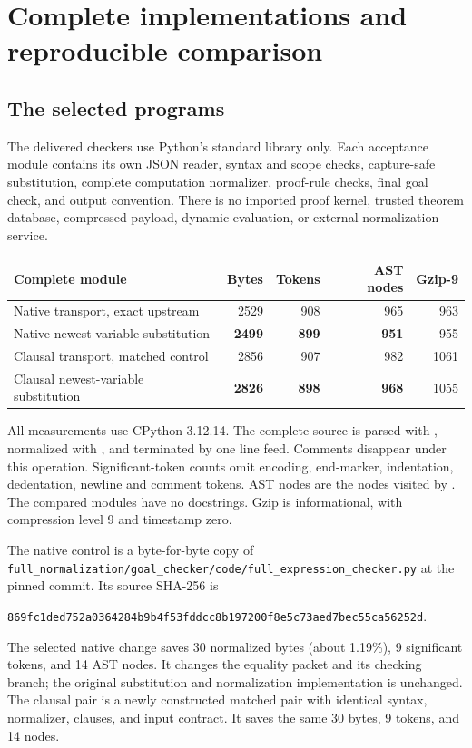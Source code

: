 \section{Complete implementations and reproducible comparison}
\label{sec:implementation}

\subsection{The selected programs}

The delivered checkers use Python's standard library only. Each acceptance
module contains its own JSON reader, syntax and scope checks, capture-safe
substitution, complete computation normalizer, proof-rule checks, final
goal check, and output convention. There is no imported proof kernel,
trusted theorem database, compressed payload, dynamic evaluation, or
external normalization service.

\begin{center}
\begin{tabular}{lrrrr}
\toprule
Complete module & Bytes & Tokens & AST nodes & Gzip-9\\
\midrule
Native transport, exact upstream & 2529 & 908 & 965 & 963\\
Native newest-variable substitution & \textbf{2499} & \textbf{899} & \textbf{951} & 955\\
\midrule
Clausal transport, matched control & 2856 & 907 & 982 & 1061\\
Clausal newest-variable substitution & \textbf{2826} & \textbf{898} & \textbf{968} & 1055\\
\bottomrule
\end{tabular}
\end{center}

All measurements use CPython 3.12.14. The complete source is parsed with
, normalized with , and terminated by one
line feed. Comments disappear under this operation. Significant-token
counts omit encoding, end-marker, indentation, dedentation, newline and
comment tokens. AST nodes are the nodes visited by .
The compared modules have no docstrings. Gzip is informational, with
compression level 9 and timestamp zero.

The native control is a byte-for-byte copy of
\nolinkurl{full_normalization/goal_checker/code/full_expression_checker.py}
at the pinned commit. Its source SHA-256 is
\begin{center}\small
\texttt{869fc1ded752a0364284b9b4f53fddcc8b197200f8e5c73aed7bec55ca56252d}.
\end{center}
The selected native change saves 30 normalized bytes (about 1.19\%),
9 significant tokens, and 14 AST nodes. It changes the equality packet
and its checking branch; the original substitution and normalization
implementation is unchanged. The clausal pair is a newly constructed
matched pair with identical syntax, normalizer, clauses, and input contract.
It saves the same 30 bytes, 9 tokens, and 14 nodes.


